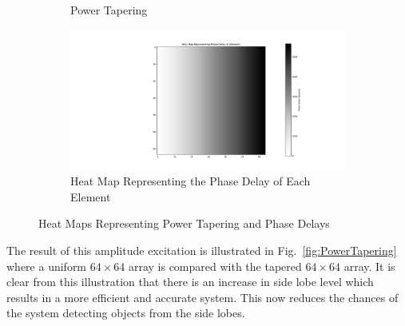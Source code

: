 \documentclass[11pt]{witseiepaper}
\begin{document}
\begin{bibunit}[witseie]
\begin{figure}[htb]
\begin{subfigure}{.5\textwidth}
            \caption{Power Tapering}
            \label{fig:PowerTaperingHeatMap}
        \end{subfigure}%
        \begin{subfigure}{.5\textwidth}
            \centering
            \includegraphics[width=0.9\linewidth]{PhasingHeatMap.pdf}
            \caption{Heat Map Representing the Phase Delay of Each Element}
                \label{fig:PhasingHeatMap}
            \end{subfigure}
\caption{Heat Maps Representing Power Tapering and Phase Delays}
\label{fig:HeatMaps}
\end{figure}
The result of this amplitude excitation is illustrated in Fig.~\ref{fig:PowerTapering} where a uniform $64 \times 64$ array is compared with the tapered $64 \times 64$ array. It is clear from this illustration that there is an increase in side lobe level which results in a more efficient and accurate system. This now reduces the chances of the system detecting objects from the side lobes.


\end{bibunit}
\end{document}
